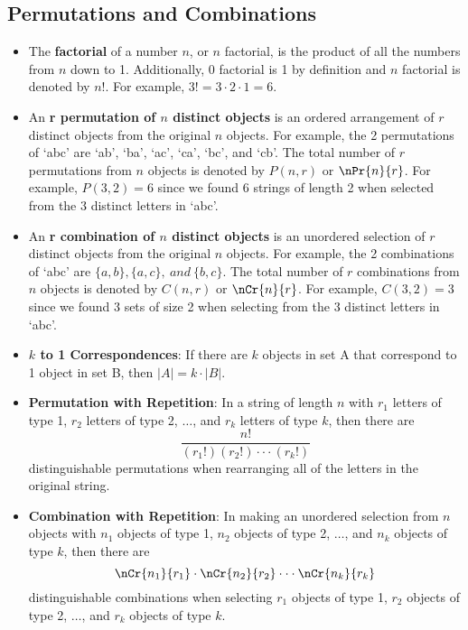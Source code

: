 \documentclass{math}
\begin{document}
\subsection*{Permutations and Combinations}
\begin{itemize}
  \item The \textbf{factorial} of a number \( n \), or \( n \) factorial, is
    the product of all the numbers from \( n \) down to 1. Additionally, 0
    factorial is 1 by definition and \( n \) factorial is denoted by \( n! \).
    For example, \( 3! = 3\cdot2\cdot1 = 6 \).
  \item An \textbf{r permutation of \( n \) distinct objects} is an ordered
    arrangement of \( r \) distinct objects from the original \( n \) objects.
    For example, the 2 permutations of `abc' are `ab', `ba', `ac', `ca', `bc',
    and `cb'. The total number of \( r \) permutations from \( n \) objects
    is denoted by \( P(n,r) \) or \( \nPr{n}{r} \). For example, \( P(3,2) = 6
    \) since we found 6 strings of length 2 when selected from the 3 distinct
    letters in `abc'.
  \item An \textbf{r combination of \( n \) distinct objects} is an unordered
    selection of \( r \) distinct objects from the original \( n \) objects.
    For example, the 2 combinations of `abc' are \( \{a,b\},\{a,c\},\ and\
    \{b,c\} \). The total number of \( r \) combinations from \( n \) objects
    is denoted by \( C(n,r) \) or \( \nCr{n}{r} \). For example, \( C(3,2) = 3
    \) since we found 3 sets of size 2 when selecting from the 3 distinct
    letters in `abc'.
  \item \textbf{\( k \) to 1 Correspondences}: If there are \( k \) objects in
    set A that correspond to 1 object in set B, then \( |A| = k\cdot|B| \).
  \item \textbf{Permutation with Repetition}: In a string of length \( n \)
    with \( r_{1} \) letters of type 1, \( r_{2} \) letters of type 2,
    \( \dots \), and \( r_{k} \) letters of type \( k \), then there are
    \[ \frac{n!}{(r_{1}!)(r_{2}!)\cdot\cdot\cdot(r_{k}!)} \]
    distinguishable permutations when rearranging all of the letters in the
    original string.
  \item \textbf{Combination with Repetition}: In making an unordered selection
    from \( n \) objects with \( n_{1} \) objects of type 1, \( n_{2} \) objects
    of type 2, \( \dots \), and \( n_{k} \) objects of type \( k \), then there
    are
    \[ \nCr{n_{1}}{r_{1}}\cdot\nCr{n_{2}}{r_{2}}\cdot\cdot\cdot
      \nCr{n_{k}}{r_{k}} \]
    distinguishable combinations when selecting \( r_{1} \) objects of type 1,
    \( r_{2} \) objects of type 2, \( \dots \), and \( r_{k} \) objects of type
    \( k \).
\end{itemize}
\end{document}

